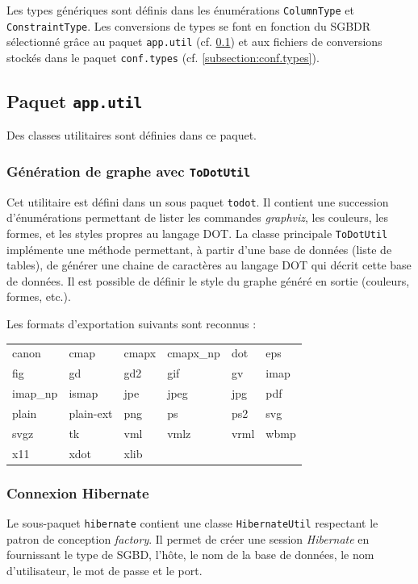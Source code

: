 Les types génériques sont définis dans les énumérations \texttt{ColumnType} et \texttt{ConstraintType}. Les conversions de types se font en fonction du SGBDR sélectionné grâce au paquet \texttt{app.util} (cf. \ref{subsection:app.util}) et aux fichiers de conversions stockés dans le paquet \texttt{conf.types} (cf. \ref{subsection:conf.types}).

\subsection{Paquet \texttt{app.util}}
\label{subsection:app.util}

Des classes utilitaires sont définies dans ce paquet.

\subsubsection{Génération de graphe avec \texttt{ToDotUtil}}
\label{section:ToDotUtil}
Cet utilitaire est défini dans un sous paquet \texttt{todot}. Il contient une succession d'énumérations permettant de lister les commandes \emph{graphviz}, les couleurs, les formes, et les styles propres au langage DOT.
La classe principale \texttt{ToDotUtil} implémente une méthode permettant, à partir d'une base de données (liste de tables), de générer une chaine de caractères au langage DOT qui décrit cette base de données. Il est possible de définir le style du graphe généré en sortie (couleurs, formes, etc.).

Les formats d'exportation suivants sont reconnus : 

\begin{center}
\begin{tabular}{l l l l l l}
canon&cmap&cmapx&cmapx\_np&dot&eps \\
fig & gd & gd2 & gif & gv & imap \\
imap\_np & ismap & jpe & jpeg & jpg & pdf \\
plain & plain-ext & png & ps & ps2 & svg \\
svgz & tk & vml & vmlz & vrml & wbmp \\
x11 & xdot & xlib & & & \\
\end{tabular}
\end{center}

\subsubsection{Connexion Hibernate}
Le sous-paquet \texttt{hibernate} contient une classe \texttt{HibernateUtil} respectant le patron de conception \emph{factory}. Il permet de créer une session \emph{Hibernate} en fournissant le type de SGBD, l'hôte, le nom de la base de données, le nom d'utilisateur, le mot de passe et le port.

